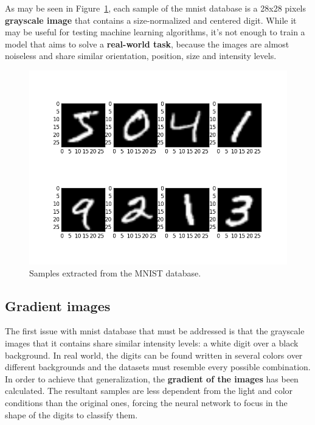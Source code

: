 As may be seen in Figure~\ref{fig:mnist}, each sample of the \gls{mnist} database is a 28x28 pixels \textbf{grayscale image} that contains a size-normalized and centered digit. While it may be useful for testing machine learning algorithms, it's not enough to train a model that aims to solve a \textbf{real-world task}, because the images are almost noiseless and share similar orientation, position, size and intensity levels.
\begin{figure}
	\centering
	\includegraphics[width=12cm, keepaspectratio]{figures/mnist.png}
	\caption{Samples extracted from the MNIST database.}
	\label{fig:mnist}
\end{figure}

\subsection{Gradient images}\label{subsec:edge}
The first issue with \gls{mnist} database that must be addressed is that the grayscale images that it contains share similar intensity levels: a white digit over a black background. In real world, the digits can be found written in several colors over different backgrounds and the datasets must resemble every possible combination. In order to achieve that generalization, the \textbf{gradient of the images} has been calculated. The resultant samples are less dependent from the light and color conditions than the original ones, forcing the neural network to focus in the shape of the digits to classify them.

